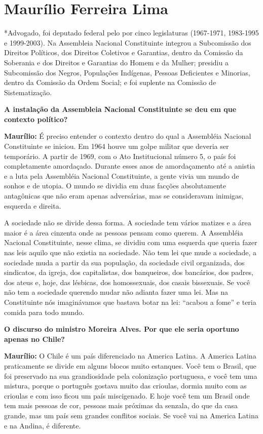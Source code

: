 \chapter{Maurílio Ferreira Lima}

*Advogado, foi deputado federal pelo  por cinco legislaturas
(1967-1971, 1983-1995 e 1999-2003). Na Assembleia Nacional Constituinte
integrou a Subcomissão dos Direitos Políticos, dos Direitos Coletivos e
Garantias, dentro da Comissão da Soberania e dos Direitos e Garantias do
Homem e da Mulher; presidiu a Subcomissão dos Negros, Populações
Indígenas, Pessoas Deficientes e Minorias, dentro da Comissão da Ordem
Social; e foi suplente na Comissão de Sistematização.

\textbf{A instalação da Assembleia Nacional Constituinte se deu em que
contexto político? }

\textbf{Maurílio:} É preciso entender o contexto dentro do qual a
Assembléia Nacional Constituinte se iniciou. Em 1964 houve um golpe
militar que deveria ser temporário. A partir de 1969, com o Ato
Institucional número 5, o país foi completamente amordaçado. Durante
esses anos de amordaçamento até a anistia e a luta pela Assembléia
Nacional Constituinte, a gente vivia um mundo de sonhos e de utopia. O
mundo se dividia em duas facções absolutamente antagônicas que não eram
apenas adversárias, mas se consideravam inimigas, esquerda e direita.

A sociedade não se divide dessa forma. A sociedade tem vários matizes e
a área maior é a área cinzenta onde as pessoas pensam como querem. A
Assembléia Nacional Constituinte, nesse clima, se dividiu com uma
esquerda que queria fazer nas leis aquilo que não existia na sociedade.
Não tem lei que mude a sociedade, a sociedade muda a partir da sua
população, da sociedade civil organizada, dos sindicatos, da igreja, dos
capitalistas, dos banqueiros, dos bancários, dos padres, dos ateus e,
hoje, das lésbicas, dos homossexuais, dos casais bissexuais. Se você não
tem a sociedade querendo mudar não adianta fazer uma lei. Mas na
Constituinte nós imaginávamos que bastava botar na lei: ``acabou a
fome'' e teria comida para todo mundo.

\textbf{O discurso do ministro Moreira Alves. Por que ele seria oportuno
apenas no Chile?}

\textbf{Maurílio:} O Chile é um país diferenciado na America Latina. A
America Latina praticamente se divide em alguns blocos muito estanques.
Você tem o Brasil, que foi preservado na sua grandiosidade pela
colonização portuguesa, e você tem uma mistura, porque o português
gostava muito das crioulas, dormia muito com as crioulas e com isso
ficou um país miscigenado. E hoje você tem um Brasil onde tem mais
pessoas de cor, pessoas mais próximas da senzala, do que da casa grande,
mas um país sem grandes conflitos sociais. Se você vai na America Latina
e na Andina, é diferente.

